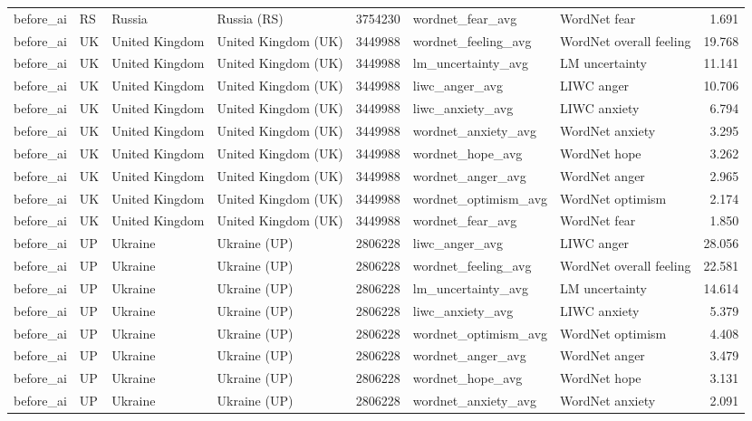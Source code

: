 \begin{tabular}{llllrllr}
before\_ai & RS & Russia & Russia (RS) & 3754230 & wordnet\_fear\_avg & WordNet fear & 1.691 \\
before\_ai & UK & United Kingdom & United Kingdom (UK) & 3449988 & wordnet\_feeling\_avg & WordNet overall feeling & 19.768 \\
before\_ai & UK & United Kingdom & United Kingdom (UK) & 3449988 & lm\_uncertainty\_avg & LM uncertainty & 11.141 \\
before\_ai & UK & United Kingdom & United Kingdom (UK) & 3449988 & liwc\_anger\_avg & LIWC anger & 10.706 \\
before\_ai & UK & United Kingdom & United Kingdom (UK) & 3449988 & liwc\_anxiety\_avg & LIWC anxiety & 6.794 \\
before\_ai & UK & United Kingdom & United Kingdom (UK) & 3449988 & wordnet\_anxiety\_avg & WordNet anxiety & 3.295 \\
before\_ai & UK & United Kingdom & United Kingdom (UK) & 3449988 & wordnet\_hope\_avg & WordNet hope & 3.262 \\
before\_ai & UK & United Kingdom & United Kingdom (UK) & 3449988 & wordnet\_anger\_avg & WordNet anger & 2.965 \\
before\_ai & UK & United Kingdom & United Kingdom (UK) & 3449988 & wordnet\_optimism\_avg & WordNet optimism & 2.174 \\
before\_ai & UK & United Kingdom & United Kingdom (UK) & 3449988 & wordnet\_fear\_avg & WordNet fear & 1.850 \\
before\_ai & UP & Ukraine & Ukraine (UP) & 2806228 & liwc\_anger\_avg & LIWC anger & 28.056 \\
before\_ai & UP & Ukraine & Ukraine (UP) & 2806228 & wordnet\_feeling\_avg & WordNet overall feeling & 22.581 \\
before\_ai & UP & Ukraine & Ukraine (UP) & 2806228 & lm\_uncertainty\_avg & LM uncertainty & 14.614 \\
before\_ai & UP & Ukraine & Ukraine (UP) & 2806228 & liwc\_anxiety\_avg & LIWC anxiety & 5.379 \\
before\_ai & UP & Ukraine & Ukraine (UP) & 2806228 & wordnet\_optimism\_avg & WordNet optimism & 4.408 \\
before\_ai & UP & Ukraine & Ukraine (UP) & 2806228 & wordnet\_anger\_avg & WordNet anger & 3.479 \\
before\_ai & UP & Ukraine & Ukraine (UP) & 2806228 & wordnet\_hope\_avg & WordNet hope & 3.131 \\
before\_ai & UP & Ukraine & Ukraine (UP) & 2806228 & wordnet\_anxiety\_avg & WordNet anxiety & 2.091 \\

\end{tabular}
